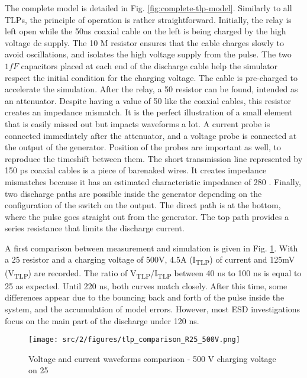 The complete model is detailed in Fig. \ref{fig:complete-tlp-model}.
Similarly to all TLPs, the principle of operation is rather straightforward.
Initially, the relay is left open while the 50ns coaxial cable on the left is being charged by the high voltage \gls{dc} supply.
The 10 M\textOmega{} resistor ensures that the cable charges slowly to avoid oscillations, and isolates the high voltage supply from the pulse.
The two $1 fF$ capacitors placed at each end of the discharge cable help the simulator respect the initial condition for the charging voltage.
The cable is pre-charged to accelerate the simulation.
After the relay, a 50 \textOmega{} resistor can be found, intended as an attenuator.
Despite having a value of 50\textOmega{} like the coaxial cables, this resistor creates an impedance mismatch.
It is the perfect illustration of a small element that is easily missed out but impacts waveforms a lot.
A current probe is connected immediately after the attenuator, and a voltage probe is connected at the output of the generator.
Position of the probes are important as well, to reproduce the timeshift between them.
The short transmission line represented by 150 ps coaxial cables is a piece of barenaked wires.
It creates impedance mismatches because it has an estimated characteristic impedance of 280 \textOmega{}.
Finally, two discharge paths are possible inside the generator depending on the configuration of the switch on the output.
The direct path is at the bottom, where the pulse goes straight out from the generator.
The top path provides a series resistance that limits the discharge current.

A first comparison between measurement and simulation is given in Fig. \ref{fig:comparison-tlp-load}.
With a 25\textOmega{} resistor and a charging voltage of 500V, 4.5A (I\textsubscript{TLP}) of current and 125mV (V\textsubscript{TLP}) are recorded.
The ratio of V\textsubscript{TLP}/I\textsubscript{TLP} between 40 ns to 100 ns is equal to 25\textOmega{} as expected.
Until 220 ns, both curves match closely.
After this time, some differences appear due to the bouncing back and forth of the pulse inside the system, and the accumulation of model errors.
However, most ESD investigations focus on the main part of the discharge under 120 ns.

\begin{figure}[!h]
  \centering
  \texttt{[image: src/2/figures/tlp\_comparison\_R25\_500V.png]}
  \caption{Voltage and current waveforms comparison - 500 V charging voltage on 25\textOmega{}}
  \label{fig:comparison-tlp-load}
\end{figure}

